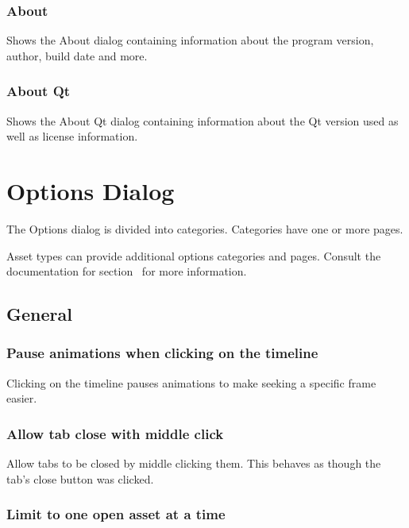 \documentclass[10pt, a4paper, titlepage, oneside]{article}
\begin{document}
\subsubsection{About}

Shows the About dialog containing information about the program version, author, build date and more.

\subsubsection{About Qt}

Shows the About Qt dialog containing information about the Qt version used as well as license information.

\newpage

\section{Options Dialog}

The Options dialog is divided into categories. Categories have one or more pages.

Asset types can provide additional options categories and pages. Consult the documentation for section~ for more information.

\subsection{General}

\subsubsection{Pause animations when clicking on the timeline}

Clicking on the timeline pauses animations to make seeking a specific frame easier.

\subsubsection{Allow tab close with middle click}

Allow tabs to be closed by middle clicking them. This behaves as though the tab's close button was clicked.

\subsubsection{Limit to one open asset at a time}
\end{document}
